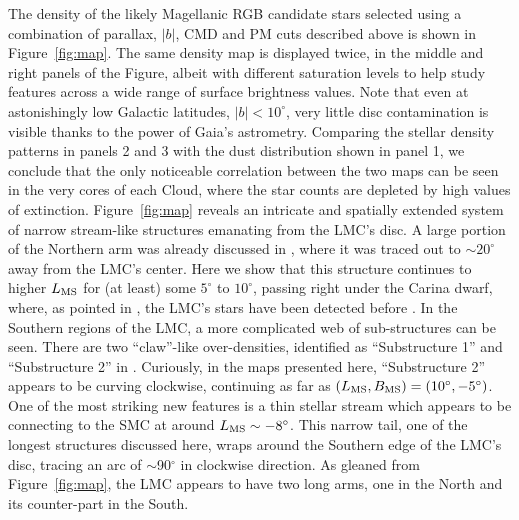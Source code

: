\documentclass[a4paper,useAMS,usenatbib]{mnras}
\begin{document}
The density of the likely Magellanic RGB candidate stars selected
using a combination of parallax, $|b|$, CMD and PM cuts
described above is shown in Figure~\ref{fig:map}. The same density map
is displayed twice, in the middle and right panels of the Figure,
albeit with different saturation levels to help study features across
a wide range of surface brightness values. Note that even at
astonishingly low Galactic latitudes, $|b|<10^{\circ}$, very little
disc contamination is visible thanks to the power of Gaia's
astrometry. Comparing the stellar density patterns in panels 2 and 3
with the dust distribution shown in panel 1, we conclude that the
only noticeable correlation between the two maps can be seen in the
very cores of each Cloud, where the star counts are depleted by high
values of extinction. Figure~\ref{fig:map} reveals an intricate and
spatially extended system of narrow stream-like structures emanating
from the LMC's disc. A large portion of the Northern arm was already
discussed in \citet{Mackey2016}, where it was traced out to
$\sim20^{\circ}$ away from the LMC's center. Here we show that this
structure continues to higher $L_{\rm MS}$ for (at least) some
$5^{\circ}$ to $10^{\circ}$, passing right under the Carina dwarf,
where, as pointed in \citet{Mackey2016}, the LMC's stars have been
detected before \citep[see][]{Majewski2000, McMonigal2014}. In the
Southern regions of the LMC, a more complicated web of sub-structures
can be seen. There are two ``claw''-like over-densities, identified as
``Substructure 1'' and ``Substructure 2'' in
\citet{Mackey2018}. Curiously, in the maps presented here,
``Substructure 2'' appears to be curving clockwise, continuing as far
as $(L_{\rm MS}, B_{\rm MS})=(10^{\circ},-5^{\circ})$. One of the most
striking new features is a thin stellar stream which appears to be
connecting to the SMC at around $L_{\rm MS}\sim-8^{\circ}$. This
narrow tail, one of the longest structures discussed here, wraps
around the Southern edge of the LMC's disc, tracing an arc of
$\sim$90$^{\circ}$ in clockwise direction. As gleaned from
Figure~\ref{fig:map}, the LMC appears to have two long arms, one in
the North and its counter-part in the South.
\end{document}
